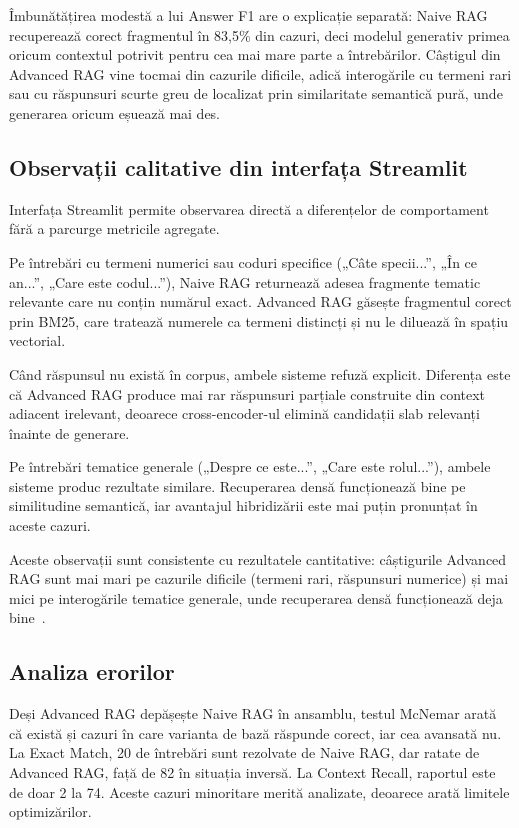 Îmbunătățirea modestă a lui Answer F1 are o explicație separată: Naive RAG recuperează corect fragmentul în 83,5\% din cazuri, deci modelul generativ primea oricum contextul potrivit pentru cea mai mare parte a întrebărilor. Câștigul din Advanced RAG vine tocmai din cazurile dificile, adică interogările cu termeni rari sau cu răspunsuri scurte greu de localizat prin similaritate semantică pură, unde generarea oricum eșuează mai des.

\subsection{Observații calitative din interfața Streamlit}

Interfața Streamlit permite observarea directă a diferențelor de comportament fără a parcurge metricile agregate.

Pe întrebări cu termeni numerici sau coduri specifice („Câte specii...”, „În ce an...”, „Care este codul...”), Naive RAG returnează adesea fragmente tematic relevante care nu conțin numărul exact. Advanced RAG găsește fragmentul corect prin BM25, care tratează numerele ca termeni distincți și nu le diluează în spațiu vectorial.

Când răspunsul nu există în corpus, ambele sisteme refuză explicit. Diferența este că Advanced RAG produce mai rar răspunsuri parțiale construite din context adiacent irelevant, deoarece cross-encoder-ul elimină candidații slab relevanți înainte de generare.

Pe întrebări tematice generale („Despre ce este...”, „Care este rolul...”), ambele sisteme produc rezultate similare. Recuperarea densă funcționează bine pe similitudine semantică, iar avantajul hibridizării este mai puțin pronunțat în aceste cazuri.

Aceste observații sunt consistente cu rezultatele cantitative: câștigurile Advanced RAG sunt mai mari pe cazurile dificile (termeni rari, răspunsuri numerice) și mai mici pe interogările tematice generale, unde recuperarea densă funcționează deja bine~\cite{gao2024retrievalaugmentedgenerationlargelanguage,robertson2009bm25}.

\subsection{Analiza erorilor}

Deși Advanced RAG depășește Naive RAG în ansamblu, testul McNemar arată că există și cazuri în care varianta de bază răspunde corect, iar cea avansată nu. La Exact Match, 20 de întrebări sunt rezolvate de Naive RAG, dar ratate de Advanced RAG, față de 82 în situația inversă. La Context Recall, raportul este de doar 2 la 74. Aceste cazuri minoritare merită analizate, deoarece arată limitele optimizărilor.

